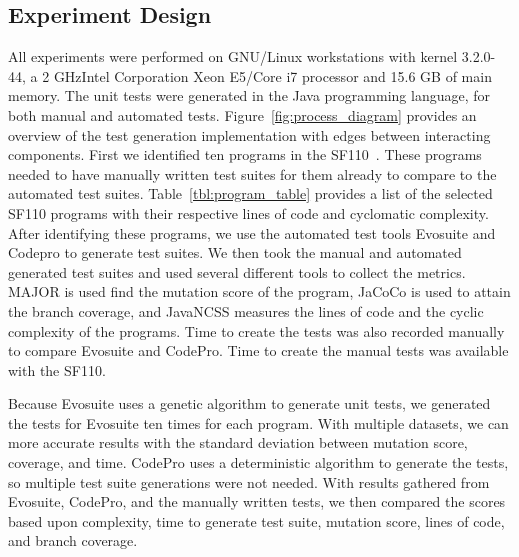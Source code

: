 \subsection{Experiment Design}

All experiments were performed on GNU/Linux workstations with kernel 3.2.0-44, a 2 GHzIntel Corporation Xeon E5/Core i7 processor and  15.6 GB of main memory. The unit tests were generated in the Java programming language, for both manual and automated tests. Figure~\ref{fig:process_diagram}  provides an overview of the test generation implementation with edges between interacting components. First we identified ten programs in the SF110~\cite{SF110:Fraser:2012}. These programs needed to have manually written test suites for them already to compare to the automated test suites. Table~\ref{tbl:program_table} provides a list of the selected SF110 programs with their respective lines of code and cyclomatic complexity.  After identifying these programs, we use the automated test tools Evosuite and Codepro to generate test suites. We then took the manual and automated generated test suites and used several different tools to collect the metrics. MAJOR is used find the mutation score of the program, JaCoCo is used to attain the branch coverage, and JavaNCSS measures the lines of code and the cyclic complexity of the programs. Time to create the tests was also recorded manually to compare Evosuite and CodePro. Time to create the manual tests was available with the SF110.

Because Evosuite uses a genetic algorithm to generate unit tests, we generated the tests for Evosuite ten times for each program. With multiple datasets, we can more accurate results with the standard deviation between mutation score, coverage, and time. CodePro uses a deterministic algorithm to generate the tests, so multiple test suite generations were not needed. With results gathered from Evosuite, CodePro, and the manually written tests, we then compared the scores based upon complexity, time to generate test suite, mutation score, lines of code, and branch coverage.

